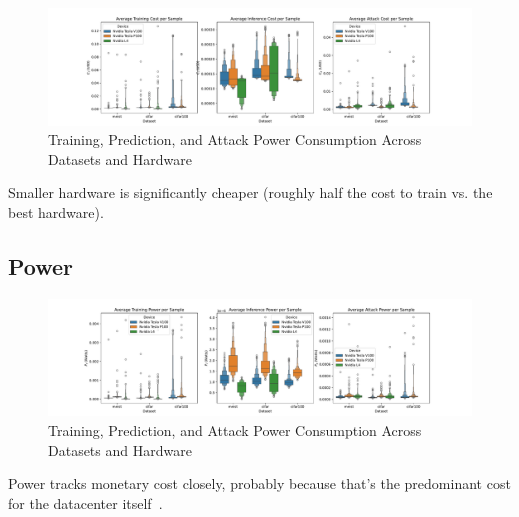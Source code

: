 \documentclass[conference]{IEEEtran}
\begin{document}
\begin{figure}
    \centering
    \includegraphics[width=\textwidth]{plots/combined/cost.pdf}
    \caption{Training, Prediction, and Attack Power Consumption Across Datasets and Hardware}
    \label{fig:time}
\end{figure}
Smaller hardware is significantly cheaper (roughly half the cost to train vs. the best hardware).

\subsection{Power}
\begin{figure}
    \centering
    \includegraphics[width=\textwidth]{plots/combined/power.pdf}
    \caption{Training, Prediction, and Attack Power Consumption Across Datasets and Hardware}
    \label{fig:time}
\end{figure}
Power tracks monetary cost closely, probably because that's the predominant cost for the datacenter itself~\cite{}.

\subsection{}
\end{document}
